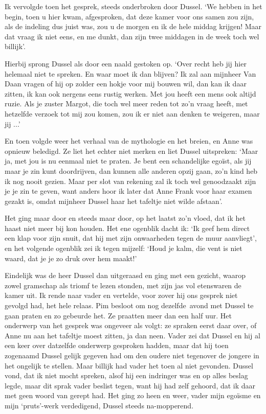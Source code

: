 \documentclass{book}
\begin{document}
Ik vervolgde toen het gesprek, steeds onderbroken door Dussel. `We
hebben in het begin, toen u hier kwam, afgesproken, dat deze kamer voor
ons samen zou zijn, als de indeling dus juist was, zou u de morgen en ik
de hele middag krijgen! Maar dat vraag ik niet eens, en me dunkt, dan
zijn twee middagen in de week toch wel billijk'.

Hierbij sprong Dussel als door een naald gestoken op. `Over recht heb
jij hier helemaal niet te spreken. En waar moet ik dan blijven? Ik zal
aan mijnheer Van Daan vragen of hij op zolder een hokje voor mij bouwen
wil, dan kan ik daar zitten, ik kan ook nergens eens rustig werken. Met
jou heeft een mens ook altijd ruzie. Als je zuster Margot, die toch wel
meer reden tot zo'n vraag heeft, met hetzelfde verzoek tot mij zou
komen, zou ik er niet aan denken te weigeren, maar jij ...'

En toen volgde weer het verhaal van de mythologie en het breien, en Anne
was opnieuw beledigd. Ze liet het echter niet merken en liet Dussel
uitspreken: `Maar ja, met jou is nu eenmaal niet te praten. Je bent een
schandelijke egoïst, als jij maar je zin kunt doordrijven, dan kunnen
alle anderen opzij gaan, zo'n kind heb ik nog nooit gezien. Maar per
slot van rekening zal ik toch wel genoodzaakt zijn je je zin te geven,
want anders hoor ik later dat Anne Frank voor haar examen gezakt is,
omdat mijnheer Dussel haar het tafeltje niet wilde afstaan'.

Het ging maar door en steeds maar door, op het laatst zo'n vloed, dat ik
het haast niet meer bij kon houden. Het ene ogenblik dacht ik: `Ik geef
hem direct een klap voor zijn snuit, dat hij met zijn onwaarheden tegen
de muur aanvliegt', en het volgende ogenblik zei ik tegen mijzelf: `Houd
je kalm, die vent is niet waard, dat je je zo druk over hem maakt!'

Eindelijk was de heer Dussel dan uitgeraasd en ging met een gezicht,
waarop zowel gramschap als triomf te lezen stonden, met zijn jas vol
etenswaren de kamer uit. Ik rende naar vader en vertelde, voor zover hij
ons gesprek niet gevolgd had, het hele relaas. Pim besloot om nog
dezelfde~avond met Dussel te gaan praten en zo gebeurde het. Ze praatten
meer dan een half uur. Het onderwerp van het gesprek was ongeveer als
volgt: ze spraken eerst daar over, of Anne nu aan het tafeltje moest
zitten, ja dan neen. Vader zei dat Dussel en hij al een keer over
datzelfde onderwerp gesproken hadden, maar dat hij toen zogenaamd Dussel
gelijk gegeven had om den oudere niet tegenover de jongere in het
ongelijk te stellen. Maar billijk had vader het toen al niet gevonden.
Dussel vond, dat ik niet mocht spreken, alsof hij een indringer was en
op alles beslag legde, maar dit sprak vader beslist tegen, want hij had
zelf gehoord, dat ik daar met geen woord van gerept had. Het ging zo
heen en weer, vader mijn egoïsme en mijn `pruts'-werk verdedigend,
Dussel steeds na-mopperend.
\end{document}
